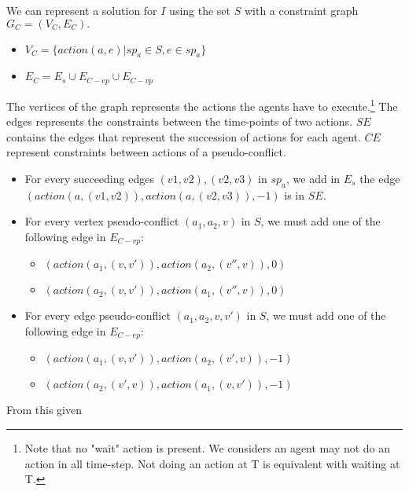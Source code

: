 We can represent a solution for $I$ using the set $S$ with a constraint graph $G_C=(V_C,E_C).$
\begin{itemize}
  \item $V_C = \{action(a,e) | sp_a \in S, e \in sp_a \}$
  \item $E_C = E_s \cup E_{C-ep} \cup E_{C-vp}$
\end{itemize}
The vertices of the graph represents the actions the agents have to execute.\footnote{Note that no "wait" action is present. We considers an agent may not do an action in all time-step. Not doing an action at T is equivalent with waiting at T.}
The edges represents the constraints between the time-points of two actions. $SE$ contains the edges that represent the succession of actions for each agent. $CE$ represent constraints between actions of a pseudo-conflict.

\begin{itemize}
  \item For every succeeding edges $(v1,v2),(v2,v3)$ in $sp_a$, we add in $E_s$ the edge $(action(a,(v1,v2)),action(a,(v2,v3)),-1)$ is in $SE$.
  \item For every vertex pseudo-conflict $(a_1,a_2,v)$ in $S$, we must add one of the following edge in $E_{C-vp}$:
  \begin{itemize}
    \item $(action(a_1,(v,v')),action(a_2,(v'',v)),0)$
    \item $(action(a_2,(v,v')),action(a_1,(v'',v)),0)$
  \end{itemize}
  \item For every edge pseudo-conflict $(a_1,a_2,v,v')$ in $S$, we must add one of the following edge in $E_{C-ep}$:
  \begin{itemize}
    \item $(action(a_1,(v,v')),action(a_2,(v',v)),-1)$
    \item $(action(a_2,(v',v)),action(a_1,(v,v')),-1)$
  \end{itemize}
\end{itemize}

From this given 
